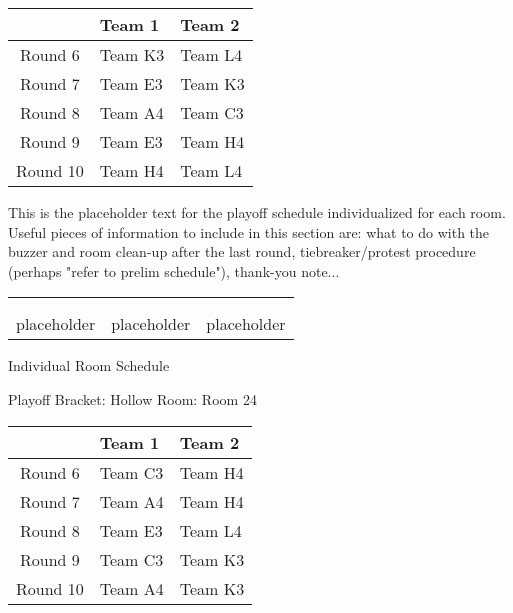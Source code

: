 \documentclass{article}%
\begin{document}
%
\begin{tabularx}{\textwidth}{|c|Y|Y|}%
\hline%
&Team 1&Team 2\\%
\hline%
Round 6&Team K3&Team L4\\%
Round 7&Team E3&Team K3\\%
Round 8&Team A4&Team C3\\%
Round 9&Team E3&Team H4\\%
Round 10&Team H4&Team L4\\%
\hline%
\end{tabularx}%
\vspace*{16pt}%
\linebreak%
This is the placeholder text for the playoff schedule individualized for each room. Useful pieces of information to include in this section are: what to do with the buzzer and room clean{-}up after the last round, tiebreaker/protest procedure (perhaps "refer to prelim schedule"), thank{-}you note...%
\vspace*{30pt}%
\newline%
%
\begin{tabularx}{\textwidth}{YYY}%
  &  &  \\%
\\%
placeholder&placeholder&placeholder\\%
\end{tabularx}%
\newpage%
\begin{center}%
\begin{Huge}%
Individual Room Schedule%
\end{Huge}%
\vspace*{16pt}%
\linebreak%
\begin{Large}%
Playoff Bracket: Hollow \hfill Room: Room 24%
\end{Large}%
\end{center}%
%
\begin{tabularx}{\textwidth}{|c|Y|Y|}%
\hline%
&Team 1&Team 2\\%
\hline%
Round 6&Team C3&Team H4\\%
Round 7&Team A4&Team H4\\%
Round 8&Team E3&Team L4\\%
Round 9&Team C3&Team K3\\%
Round 10&Team A4&Team K3\\%
\hline%
\end{tabularx}%
\end{document}
